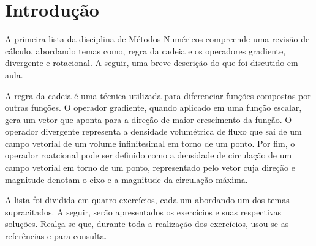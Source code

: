 \section{Introdu\c{c}\~{a}o} \label{sec:intro}
A primeira lista da disciplina de M\'etodos Num\'ericos compreende uma revis\~ao de c\'alculo, abordando temas como, regra da cadeia e os  operadores gradiente, divergente e rotacional. A seguir, uma breve descri\c{c}\~ao do que foi discutido em aula.

A regra da cadeia \'e uma t\'ecnica utilizada para diferenciar fun\c{c}\~oes compostas por outras fun\c{c}\~oes. O operador gradiente, quando aplicado em uma fun\c{c}\~ao escalar, gera um vetor que aponta para a dire\c{c}\~ao de maior crescimento da fun\c{c}\~ao. O operador divergente representa a densidade volum\'etrica de fluxo que sai de um campo vetorial de um volume infinitesimal em torno de um ponto. Por fim, o operador roatcional pode ser definido como a densidade de circula\c{c}\~ao de um campo vetorial em torno de um ponto, representado pelo vetor cuja dire\c{c}\~ao e magnitude denotam o eixo e a magnitude da circula\c{c}\~ao m\'axima.

A lista foi dividida em quatro exerc\'icios, cada um abordando um dos temas supracitados. A seguir, ser\~ao apresentados os exerc\'icios e suas respectivas solu\c{c}\~oes. Real\c{c}a-se que, durante toda a realiza\c{c}\~ao dos exerc\'icios, usou-se as refer\^encias \cite{stewart2007essential} e \cite{becker1981finite} para consulta.